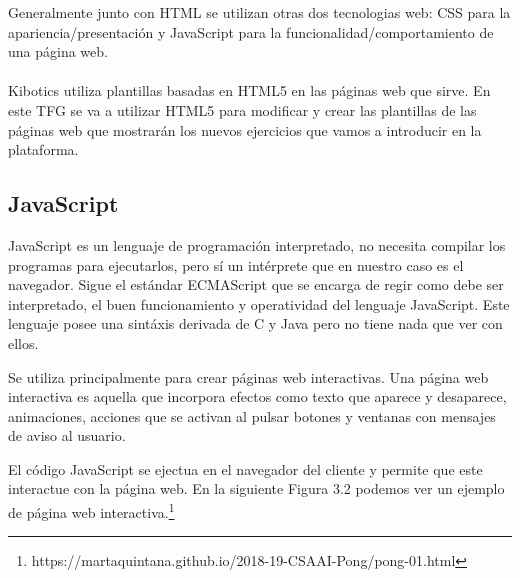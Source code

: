 Generalmente junto con HTML se utilizan otras dos tecnologias web: CSS para la apariencia/presentación y JavaScript para la funcionalidad/comportamiento de una página web.
\\
\\
Kibotics utiliza plantillas basadas en HTML5 en las páginas web que sirve. En este TFG se va a utilizar HTML5 para modificar y crear las plantillas de las páginas web que mostrarán los nuevos ejercicios que vamos a introducir en la plataforma.

\subsection{JavaScript}
JavaScript es un lenguaje de programación interpretado, no necesita compilar los programas para ejecutarlos, pero sí un intérprete que en nuestro caso es el navegador. Sigue el estándar ECMAScript que se encarga de regir como debe ser interpretado, el buen funcionamiento y operatividad del lenguaje JavaScript. Este lenguaje posee una sintáxis derivada de C y Java pero no tiene nada que ver con ellos.

Se utiliza principalmente para crear
páginas web interactivas.
Una página web interactiva es aquella que incorpora efectos como texto que aparece y
desaparece, animaciones, acciones que se activan al pulsar botones y ventanas con
mensajes de aviso al usuario\cite{javascript}.

El código JavaScript se ejectua en el navegador del cliente y permite que este interactue con la página web. En la siguiente Figura 3.2 podemos ver un ejemplo de página web interactiva.\footnote{https://martaquintana.github.io/2018-19-CSAAI-Pong/pong-01.html}


